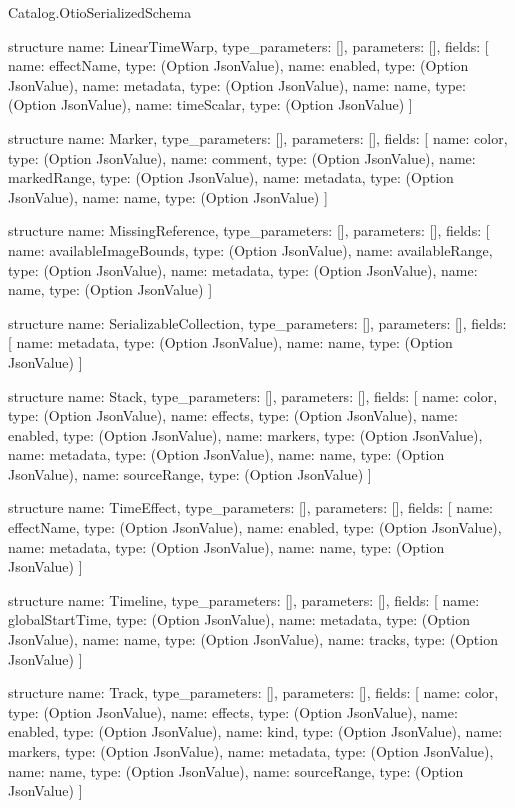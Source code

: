 \begin{lexlean}{Catalog.OtioSerializedSchema}
\begin{semanticmodule}
structure{
  name: LinearTimeWarp,
  type_parameters: [],
  parameters: [],
  fields: [
    {name: effectName, type: (Option JsonValue)},
    {name: enabled, type: (Option JsonValue)},
    {name: metadata, type: (Option JsonValue)},
    {name: name, type: (Option JsonValue)},
    {name: timeScalar, type: (Option JsonValue)}
  ]
}

structure{
  name: Marker,
  type_parameters: [],
  parameters: [],
  fields: [
    {name: color, type: (Option JsonValue)},
    {name: comment, type: (Option JsonValue)},
    {name: markedRange, type: (Option JsonValue)},
    {name: metadata, type: (Option JsonValue)},
    {name: name, type: (Option JsonValue)}
  ]
}

structure{
  name: MissingReference,
  type_parameters: [],
  parameters: [],
  fields: [
    {name: availableImageBounds, type: (Option JsonValue)},
    {name: availableRange, type: (Option JsonValue)},
    {name: metadata, type: (Option JsonValue)},
    {name: name, type: (Option JsonValue)}
  ]
}

structure{
  name: SerializableCollection,
  type_parameters: [],
  parameters: [],
  fields: [
    {name: metadata, type: (Option JsonValue)},
    {name: name, type: (Option JsonValue)}
  ]
}

structure{
  name: Stack,
  type_parameters: [],
  parameters: [],
  fields: [
    {name: color, type: (Option JsonValue)},
    {name: effects, type: (Option JsonValue)},
    {name: enabled, type: (Option JsonValue)},
    {name: markers, type: (Option JsonValue)},
    {name: metadata, type: (Option JsonValue)},
    {name: name, type: (Option JsonValue)},
    {name: sourceRange, type: (Option JsonValue)}
  ]
}

structure{
  name: TimeEffect,
  type_parameters: [],
  parameters: [],
  fields: [
    {name: effectName, type: (Option JsonValue)},
    {name: enabled, type: (Option JsonValue)},
    {name: metadata, type: (Option JsonValue)},
    {name: name, type: (Option JsonValue)}
  ]
}

structure{
  name: Timeline,
  type_parameters: [],
  parameters: [],
  fields: [
    {name: globalStartTime, type: (Option JsonValue)},
    {name: metadata, type: (Option JsonValue)},
    {name: name, type: (Option JsonValue)},
    {name: tracks, type: (Option JsonValue)}
  ]
}

structure{
  name: Track,
  type_parameters: [],
  parameters: [],
  fields: [
    {name: color, type: (Option JsonValue)},
    {name: effects, type: (Option JsonValue)},
    {name: enabled, type: (Option JsonValue)},
    {name: kind, type: (Option JsonValue)},
    {name: markers, type: (Option JsonValue)},
    {name: metadata, type: (Option JsonValue)},
    {name: name, type: (Option JsonValue)},
    {name: sourceRange, type: (Option JsonValue)}
  ]
}


\end{semanticmodule}
\end{lexlean}
